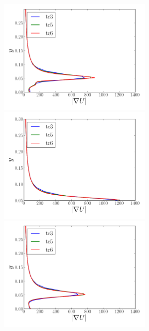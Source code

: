 \documentclass[12pt,oneside,a4paper]{article}
\begin{document}
\begin{figure}
\centering
\includegraphics[width=7.5cm]{images/CFD_meshIndependence/X1_gradU.png}\hfill \includegraphics[width=7.5cm]{images/CFD_meshIndependence/X2_gradU.png}\\
\includegraphics[width=7.5cm]{images/CFD_meshIndependence/X3_gradU.png}
\end{figure}
\end{document}
